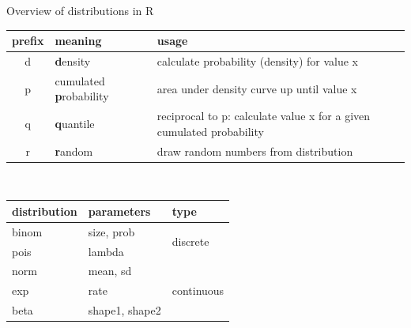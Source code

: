 \documentclass[xcolor=table,       handout,    xcolor=dvipsnames]{beamer}\usepackage[]{graphicx}\usepackage[]{color}
\begin{document}

\begin{frame}{Overview of distributions in R}
\begin{center}
\begin{tabular}{| c | m{2cm} | m{7cm} |}   \hline
  \textbf{prefix} & \textbf{meaning} &\textbf{usage}  \\ \hline  \hline
  d & \textbf{d}ensity               & calculate probability (density) for value x\\ \hline
  p & cumulated \newline \textbf{p}robability & area under density curve up until value x\\ \hline
  q & \textbf{q}uantile              & reciprocal to p: calculate value x \newline for a given cumulated probability\\ \hline
  r & \textbf{r}andom                & draw random numbers from distribution\\ \hline
\end{tabular}
\\[\baselineskip]
\begin{tabular}{| l | l | l |}   \hline
  \textbf{distribution} & \textbf{parameters} & \textbf{type}  \\ \hline  \hline
   binom & size, prob     &  \multirow{2}{*}{discrete}\\ \cline{1-2}
   pois  & lambda         &  \\ \hline
   norm  & mean, sd       &  \multirow{3}{*}{continuous}\\ \cline{1-2}
   exp   & rate           &   \\ \cline{1-2}
   beta  & shape1, shape2 &\\ \hline
\end{tabular}
\end{center}
\end{frame}

\end{document}
